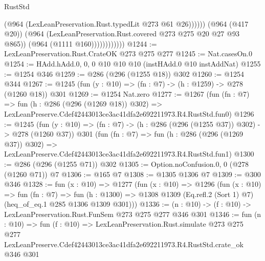 \begin{lexlean}{RustStd}
\begin{coremodule}
                                (@964 (LexLeanPreservation.Rust.typedLit @273 @61 @26))))))
                        (@964 (@417 @20))
                        (@964 (LexLeanPreservation.Rust.covered @273 @275 @20 @27 @93 @865))
                        (@964 (@1111 @160))))))))))))
@1244 := LexLeanPreservation.Rust.CrateOK @273 @275 @277
@1245 := Nat.casesOn.{0}
@1254 := HAdd.hAdd.{0, 0, 0} @10 @10 @10 (instHAdd.{0} @10 instAddNat)
@1255 := @1254 @346
@1259 := @286 (@296 (@1255 @18)) @302
@1260 := @1254 @344
@1267 := @1245 (fun (y : @10) => (fn : @7) -> (h : @1259) -> @278 (@1260 @18)) @301
@1269 := @1254 Nat.zero
@1277 := @1267
    (fun (fn : @7) =>
    fun (h : @286 (@296 (@1269 @18)) @302) =>
    LexLeanPreserve.Cdef42443013ce3ac41dfa2e692211973.R4.RustStd.fun0)
@1296 := @1245
    (fun (y : @10) => (fn : @7) -> (h : @286 (@296 (@1255 @37)) @302) -> @278 (@1260 @37))
    @301
    (fun (fn : @7) =>
    fun (h : @286 (@296 (@1269 @37)) @302) =>
    LexLeanPreserve.Cdef42443013ce3ac41dfa2e692211973.R4.RustStd.fun1)
@1300 := @286 (@296 (@1255 @71)) @302
@1305 := Option.noConfusion.{0, 0} (@278 (@1260 @71)) @7
@1306 := @165 @7
@1308 := @1305 @1306 @7
@1309 := @300 @346
@1328 := fun (x : @10) =>
  @1277
    (fun (x : @10) =>
    @1296
      (fun (x : @10) =>
      fun (fn : @7) =>
      fun (h : @1300) =>
      @1308 @1309 (Eq.refl.{2} (Sort 1) @7) (heq_of_eq.{1} @285 @1306 @1309 @301)))
@1336 := (n : @10) -> (f : @10) -> LexLeanPreservation.Rust.FunSem @273 @275 @277 @346 @301
@1346 := fun (n : @10) =>
  fun (f : @10) =>
  LexLeanPreservation.Rust.simulate
    @273
    @275
    @277
    LexLeanPreserve.Cdef42443013ce3ac41dfa2e692211973.R4.RustStd.crate_ok
    @346
    @301
\end{coremodule}
\end{lexlean}
